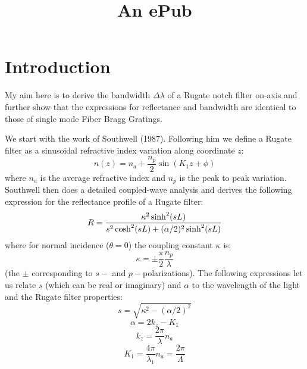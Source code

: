 \documentclass[text,itex,epub]{internet}
\title{An ePub}
\begin{document}
\tableofcontents

\section*{Introduction}

My aim here is to derive the bandwidth $\Delta\lambda$ of a Rugate notch filter on-axis and further show that the expressions for reflectance and bandwidth are identical to those of single mode Fiber Bragg Gratings. 

We start with the work of Southwell (1987).  Following him we define a Rugate filter as a  sinusoidal refractive index variation along coordinate $z$:
\[ n(z) = n_a + \frac{n_p}{2} \sin(K_1 z + \phi)  \] 
where $n_a$ is the average refractive index and $n_p$ is the peak to peak variation.
Southwell then does a  detailed coupled-wave analysis and derives 
the following expression for the reflectance profile of a Rugate filter:
\[
R= {  \kappa^2 \sinh^2(sL) \over
s^2 \cosh^2(sL) + (\alpha/2)^2 \sinh^2(sL)
}
\]
where for normal incidence ($\theta=0$) the coupling constant $\kappa$ is:
\[\kappa= \pm \frac{\pi}{2} \frac{n_p}{\lambda}  \]
(the $\pm$ corresponding to $s-$ and $p-$polarizations). The following expressions let us relate $s$ (which can be real or imaginary) and $\alpha$ 
to the wavelength of the light and the Rugate filter properties:
\[ s=\sqrt{\kappa^2 - (\alpha/2)^2} \]
\[ \alpha = 2 k_z - K_1 \]
\[k_z = \frac{2 \pi}{\lambda} n_a \]
\[ K_1  =  \frac{4 \pi}{\lambda_1} n_a = \frac{2 \pi}{\Lambda}\]
\end{document}
